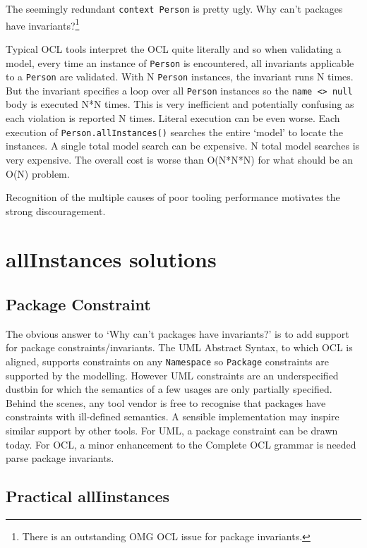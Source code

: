 \documentclass[
]{ceurart}
\begin{document}
The seemingly redundant \verb!context Person! is pretty ugly. Why can't packages have invariants?\footnote{There is an outstanding OMG OCL issue for package invariants.}

Typical OCL tools interpret the OCL quite literally and so when validating a model, every time an instance of \verb!Person! is encountered, all invariants applicable to a \verb!Person! are validated. With N \verb!Person! instances, the invariant runs N times. But the invariant specifies a loop over all \verb!Person! instances so the \verb!name <> null! body is executed N*N times. This is very inefficient and potentially confusing as each violation is reported N times. Literal execution can be even worse. Each execution of \verb!Person.allInstances()! searches the entire `model' to locate the instances. A single total model search can be expensive. N total model searches is very expensive. The overall cost is worse than O(N*N*N) for what should be an O(N) problem.

Recognition of the multiple causes of poor tooling performance motivates the strong discouragement.

\section{allInstances solutions}\label{Solutions}

\subsection{Package Constraint}

The obvious answer to `Why can't packages have invariants?' is to add support for package constraints/invariants. The UML Abstract Syntax, to which OCL is aligned, supports constraints on any \verb!Namespace! so \verb!Package! constraints are supported by the modelling. However UML constraints are an underspecified dustbin for which the semantics of a few usages are only partially specified. Behind the scenes, any tool vendor is free to recognise that packages have constraints with ill-defined semantics. A sensible implementation may inspire similar support by other tools. For UML, a package constraint can be drawn today. For OCL, a minor enhancement to the Complete OCL grammar is needed parse package invariants. 

\subsection{Practical allIinstances}
\end{document}
